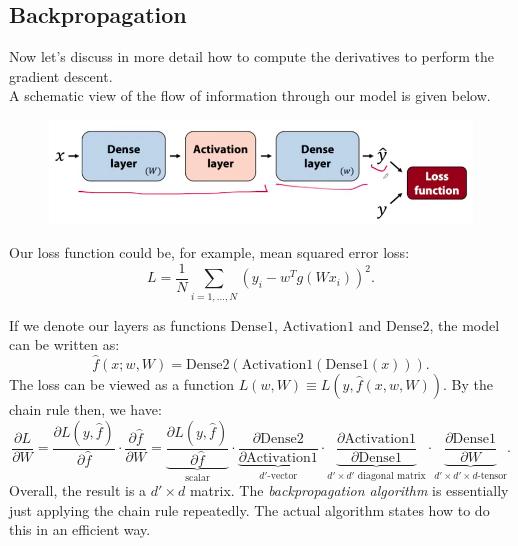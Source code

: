 \minirule

\subsection{Backpropagation}
Now let's discuss in more detail how to compute the derivatives to perform the gradient descent.\\

A schematic view of the flow of information through our model is given below.
\begin{figure}[H]
\centering
\includegraphics[scale=0.4]{backpropagation1.png}
\end{figure}

Our loss function could be, for example, mean squared error loss:
\begin{equation*}
L = \frac{1}{N} \sum_{i=1,...,N} \left( y_i - w^T g(Wx_i) \right)^2. 
\end{equation*}



\newpage
If we denote our layers as functions $\textrm{Dense1}$, $\textrm{Activation1}$ and $\textrm{Dense2}$, the model can be written as:
\begin{equation*}
\hat{f}(x;w,W) = \textrm{Dense2}(\textrm{Activation1}(\textrm{Dense1}(x))).
\end{equation*}
The loss can be viewed as a function $L(w,W) \equiv L(y,\hat{f}(x,w,W))$. By the chain rule then, we have:
\begin{equation*}
\frac{\partial L}{\partial W} = \frac{\partial L(y,\hat{f})}{\partial \hat{f}} \cdot \frac{\partial \hat{f}}{\partial W} = \underbrace{\frac{\partial L(y,\hat{f})}{\partial \hat{f}}}_{\text{scalar}} \cdot \underbrace{\frac{\partial \textrm{Dense2}}{\partial \textrm{Activation1}}}_{d'\text{-vector}} \cdot \underbrace{\frac{\partial \textrm{Activation1}}{\partial \textrm{Dense1}}}_{\text{$d' \times d'$ diagonal matrix}} \cdot \underbrace{\frac{\partial \textrm{Dense1}}{\partial W}}_{\text{$d' \times d' \times d$-tensor}}.
\end{equation*}
Overall, the result is a $d' \times d$ matrix. The \textit{backpropagation algorithm} is essentially just applying the chain rule repeatedly. The actual algorithm states how to do this in an efficient way.\\

